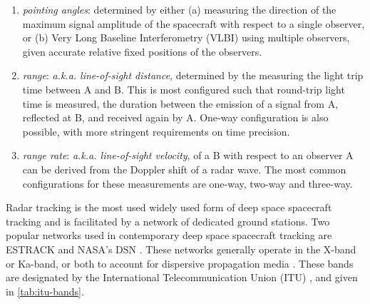 \begin{enumerate}
    \item \textit{pointing angles}: determined by either (a) measuring the
          direction of the maximum signal amplitude of the spacecraft with respect to
          a single observer, or (b) Very Long Baseline Interferometry (VLBI) using
          multiple observers, given accurate relative fixed positions of the
          observers.
    \item \textit{range}: \textit{a.k.a. line-of-sight distance}, determined by
          the measuring the light trip time between A and B. This is most configured
          such that round-trip light time is measured, the duration between the
          emission of a signal from A, reflected at B, and received again by A.
          One-way configuration is also possible, with more stringent requirements on
          time precision.
    \item \textit{range rate}: \textit{a.k.a. line-of-sight velocity}, of
          a B with respect to an observer A can be derived from the Doppler shift
          of a radar wave. The most common configurations for these measurements are
          one-way, two-way and three-way.
\end{enumerate}

Radar tracking is the most used widely used form of deep space spacecraft tracking and is facilitated by a network of dedicated ground stations. Two popular networks used in contemporary deep space spacecraft tracking are \gls{ESTRACK} \cite{Doat2018} and NASA's \gls{DSN} \cite{Dsn2015}. These networks generally operate in the X-band or Ka-band, or both to account for dispersive propagation media \cite{Bertotti1993}. These bands are designated by the International Telecommunication Union (ITU) \cite{Berner2020}, and given in \autoref{tab:itu-bands}.

